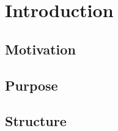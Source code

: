 \chapter{Introduction}
\label{kap:Einleitung} 

\section{Motivation}



\section{Purpose}



\section{Structure}